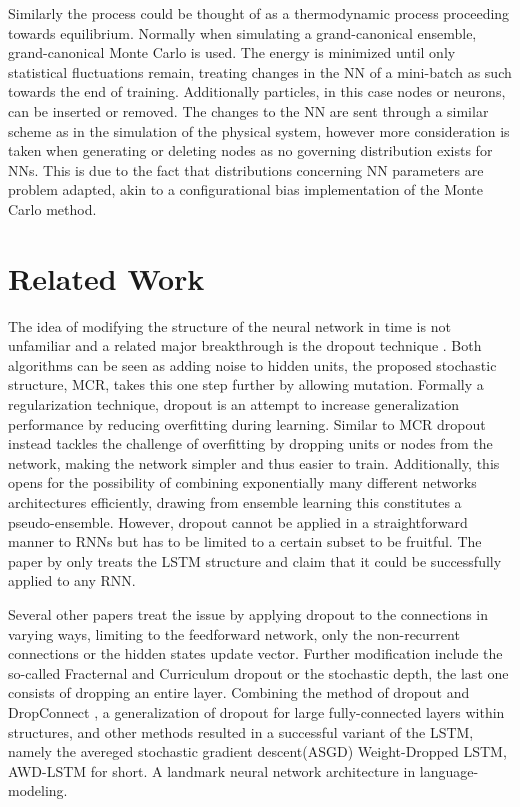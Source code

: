Similarly the process could be thought of as a thermodynamic process proceeding towards equilibrium. Normally when simulating a grand-canonical ensemble, grand-canonical Monte Carlo is used. The energy is minimized until only statistical fluctuations remain, treating changes in the NN of a mini-batch as such towards the end of training. Additionally particles, in this case nodes or neurons, can be inserted or removed. The changes to the NN are sent through a similar scheme as in the simulation of the physical system, however more consideration is taken when generating or deleting nodes as no governing distribution exists for NNs. This is due to the fact that distributions concerning NN parameters are problem adapted, akin to a configurational bias implementation of the Monte Carlo method. 

\section{Related Work}

The idea of modifying the structure of the neural network in time is not unfamiliar and a related major breakthrough is the dropout technique \cite{drop}. Both algorithms can be seen as adding noise to hidden units, the proposed stochastic structure, MCR, takes this one step further by allowing mutation. Formally a regularization technique, dropout is an attempt to increase generalization performance by reducing overfitting during learning. Similar to MCR dropout instead tackles the challenge of overfitting by dropping units or nodes from the network, making the network simpler and thus easier to train. Additionally, this opens for the possibility of combining exponentially many different networks architectures efficiently, drawing from ensemble learning this constitutes a pseudo-ensemble. However, dropout cannot be applied in a straightforward manner to RNNs \cite{dropno} but has to be limited to a certain subset\cite{droprnn} to be fruitful. The paper by \textcite{droprnn} only treats the LSTM structure and claim that it could be successfully applied to any RNN. 

Several other papers treat the issue by applying dropout to the connections in varying ways, limiting to the feedforward network, only the non-recurrent connections or the hidden states update vector. Further modification include the so-called Fracternal and Curriculum dropout or the stochastic depth, the last one consists of dropping an entire layer\cite{stochdep}. Combining the method of dropout and DropConnect \cite{DropConnect}, a generalization of dropout for large fully-connected layers within structures, and other methods resulted in a successful variant of the LSTM, namely the avereged stochastic gradient descent(ASGD) Weight-Dropped LSTM, AWD-LSTM for short. A landmark neural network architecture in language-modeling. 

